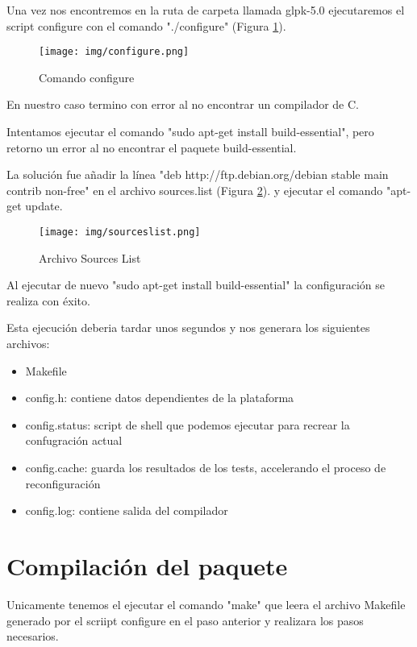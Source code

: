 \documentclass[11pt]{article}
\begin{document}
Una vez nos encontremos en la ruta de carpeta llamada glpk-5.0 ejecutaremos el script configure con el comando "./configure" (Figura \ref{fig:configure}).

\begin{figure}[h!] 
\centering
    \texttt{[image: img/configure.png]}
\caption{Comando configure}
\label{fig:configure}
\end{figure}

En nuestro caso termino con error al no encontrar un compilador de C.

Intentamos ejecutar el comando "sudo apt-get install build-essential", pero retorno un error al no encontrar el paquete build-essential.

La solución fue añadir la línea "deb http://ftp.debian.org/debian stable main contrib non-free" en el archivo sources.list (Figura \ref{fig:sourceslist}). y ejecutar el comando "apt-get update.


\begin{figure}[h!] 
\centering
    \texttt{[image: img/sourceslist.png]}
\caption{Archivo Sources List}
\label{fig:sourceslist}
\end{figure}

Al ejecutar de nuevo "sudo apt-get install build-essential" la configuración se realiza con éxito. 

Esta ejecución deberia tardar unos segundos y nos generara los siguientes archivos:

\begin{itemize}
    \item Makefile
    \item config.h: contiene datos dependientes de la plataforma
    \item config.status: script de shell que podemos ejecutar para recrear la confugración actual
    \item config.cache: guarda los resultados de los tests, accelerando el proceso de reconfiguración
    \item config.log: contiene salida del compilador
\end{itemize}

   

\section*{Compilación del paquete}

Unicamente tenemos el ejecutar el comando "make" que leera el archivo Makefile generado por el scriipt configure en el paso anterior y realizara los pasos necesarios.
\end{document}
